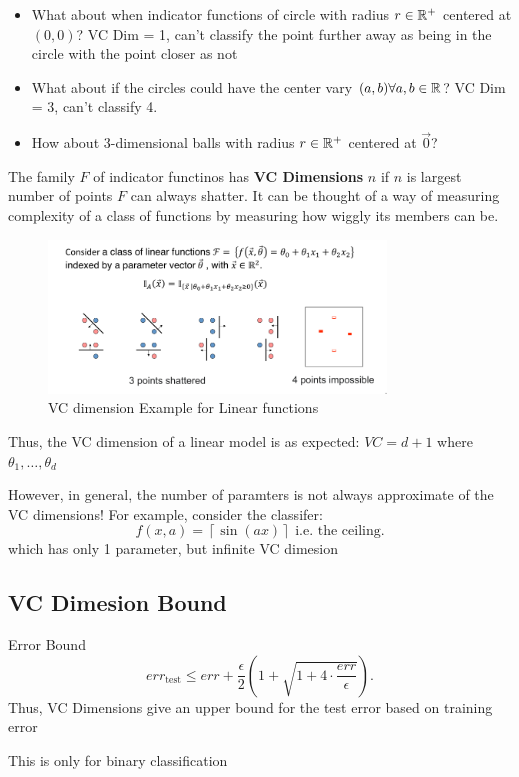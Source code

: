 \documentclass[a4paper]{article}
\begin{document}
\begin{note}
  \begin{itemize}
    \item What about when indicator functions of circle with radius $r \in \mathbb{R}^+$ centered at $\left( 0,0 \right) $? 
      VC Dim = 1, can't classify the point further away as being in the circle with the point closer as not
    \item What about if the circles could have the center vary $(a,b) \forall a,b \in \mathbb{R}$?
      VC Dim = 3, can't classify 4.
    \item How about 3-dimensional balls with radius $r \in \mathbb{R}^+$ centered at $\vec{0}$?
  \end{itemize}
\end{note}

\begin{definition}
  The family $F$ of indicator functinos has \textbf{VC Dimensions} $n$ if $n$ is largest number of points $F$ 
  can always shatter. It can be thought of a way of measuring complexity of a class of functions by
  measuring how wiggly its members can be.
\end{definition}

\begin{figure}[h]
  \centering
  \includegraphics[width=0.8\textwidth]{assets/2024-09-18-12-22-21.png}
  \caption{VC dimension Example for Linear functions}
  \label{fig:2024-09-18-12-22-21}
\end{figure}
\begin{note}
  Thus, the VC dimension of a linear model is as expected: $VC = d + 1$ where $\theta_1, \ldots, \theta_d$
\end{note}

However, in general, the number of paramters is not always approximate of the VC dimensions! For example,
consider the classifer:
\[
  f(x,a) = \left\lceil \sin(ax) \right\rceil \text{ i.e. the ceiling} 
.\] 
which has only 1 parameter, but infinite VC dimesion

\subsection{VC Dimesion Bound}
\begin{definition}{Error Bound}
  \[
    err_{\text{test}} \leq err + \frac{\epsilon}{2} \left( 1+ \sqrt{1+ 4 \cdot \frac{err}{\epsilon}}  \right) 
  .\] 
  Thus, VC Dimensions give an upper bound for the test error based on training error
\end{definition}
\begin{note} This is only for binary classification
  
\end{note}
\end{document}
